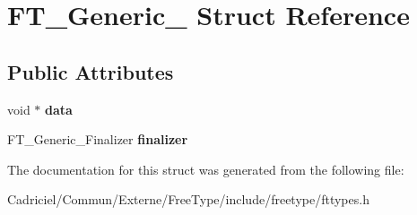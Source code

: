 \hypertarget{struct_f_t___generic__}{}\section{F\+T\+\_\+\+Generic\+\_\+ Struct Reference}
\label{struct_f_t___generic__}
\subsection*{Public Attributes}
\begin{DoxyCompactItemize}
\item 
void $\ast$ {\bfseries data}\hypertarget{struct_f_t___generic___af0bf8b983254b662f293e9a20505e27e}{}\label{struct_f_t___generic___af0bf8b983254b662f293e9a20505e27e}

\item 
F\+T\+\_\+\+Generic\+\_\+\+Finalizer {\bfseries finalizer}\hypertarget{struct_f_t___generic___a20fce8de90cc9e3876935817247b9ccc}{}\label{struct_f_t___generic___a20fce8de90cc9e3876935817247b9ccc}

\end{DoxyCompactItemize}


The documentation for this struct was generated from the following file\+:\begin{DoxyCompactItemize}
\item 
Cadriciel/\+Commun/\+Externe/\+Free\+Type/include/freetype/fttypes.\+h\end{DoxyCompactItemize}
